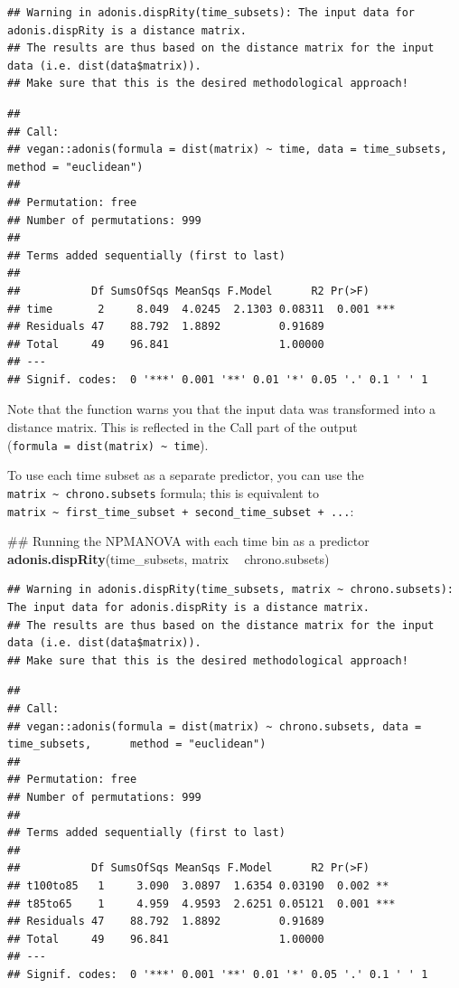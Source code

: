 \documentclass[]{book}
\newenvironment{Shaded}{\begin{snugshade}}{\end{snugshade}}
\newcommand{\KeywordTok}[1]{\textcolor[rgb]{0.13,0.29,0.53}{\textbf{#1}}}
\newcommand{\StringTok}[1]{\textcolor[rgb]{0.31,0.60,0.02}{#1}}
\newcommand{\OperatorTok}[1]{\textcolor[rgb]{0.81,0.36,0.00}{\textbf{#1}}}
\newcommand{\NormalTok}[1]{#1}
\theoremstyle{definition}
\theoremstyle{definition}
\theoremstyle{remark}
\begin{document}
\begin{verbatim}
## Warning in adonis.dispRity(time_subsets): The input data for adonis.dispRity is a distance matrix.
## The results are thus based on the distance matrix for the input data (i.e. dist(data$matrix)).
## Make sure that this is the desired methodological approach!
\end{verbatim}

\begin{verbatim}
## 
## Call:
## vegan::adonis(formula = dist(matrix) ~ time, data = time_subsets,      method = "euclidean") 
## 
## Permutation: free
## Number of permutations: 999
## 
## Terms added sequentially (first to last)
## 
##           Df SumsOfSqs MeanSqs F.Model      R2 Pr(>F)    
## time       2     8.049  4.0245  2.1303 0.08311  0.001 ***
## Residuals 47    88.792  1.8892         0.91689           
## Total     49    96.841                 1.00000           
## ---
## Signif. codes:  0 '***' 0.001 '**' 0.01 '*' 0.05 '.' 0.1 ' ' 1
\end{verbatim}

Note that the function warns you that the input data was transformed
into a distance matrix. This is reflected in the Call part of the output
(\texttt{formula\ =\ dist(matrix)\ \textasciitilde{}\ time}).

To use each time subset as a separate predictor, you can use the
\texttt{matrix\ \textasciitilde{}\ chrono.subsets} formula; this is
equivalent to
\texttt{matrix\ \textasciitilde{}\ first\_time\_subset\ +\ second\_time\_subset\ +\ ...}:

\begin{Shaded}
\begin{Highlighting}[]
\NormalTok{## Running the NPMANOVA with each time bin as a predictor}
\KeywordTok{adonis.dispRity}\NormalTok{(time_subsets, matrix }\OperatorTok{~}\StringTok{ }\NormalTok{chrono.subsets)}
\end{Highlighting}
\end{Shaded}

\begin{verbatim}
## Warning in adonis.dispRity(time_subsets, matrix ~ chrono.subsets): The input data for adonis.dispRity is a distance matrix.
## The results are thus based on the distance matrix for the input data (i.e. dist(data$matrix)).
## Make sure that this is the desired methodological approach!
\end{verbatim}

\begin{verbatim}
## 
## Call:
## vegan::adonis(formula = dist(matrix) ~ chrono.subsets, data = time_subsets,      method = "euclidean") 
## 
## Permutation: free
## Number of permutations: 999
## 
## Terms added sequentially (first to last)
## 
##           Df SumsOfSqs MeanSqs F.Model      R2 Pr(>F)    
## t100to85   1     3.090  3.0897  1.6354 0.03190  0.002 ** 
## t85to65    1     4.959  4.9593  2.6251 0.05121  0.001 ***
## Residuals 47    88.792  1.8892         0.91689           
## Total     49    96.841                 1.00000           
## ---
## Signif. codes:  0 '***' 0.001 '**' 0.01 '*' 0.05 '.' 0.1 ' ' 1
\end{verbatim}
\end{document}

